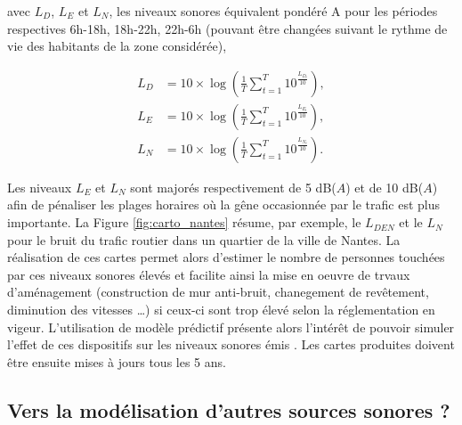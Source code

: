 avec $L_D$, $L_E$ et $L_N$, les niveaux sonores équivalent pondéré A pour les périodes respectives 6h-18h, 18h-22h, 22h-6h (pouvant être changées suivant le rythme de vie des habitants de la zone considérée),

\begin{subequations}
\begin{align}
L_D &= 10\times\log\left(\frac{1}{T} \sum_{t = 1}^{T}10^{\frac{L_{D_t}}{10}}\right),\\
L_E &= 10\times\log\left(\frac{1}{T} \sum_{t = 1}^{T}10^{\frac{L_{E_t}}{10}}\right),\\
L_N &= 10\times\log\left(\frac{1}{T} \sum_{t = 1}^{T}10^{\frac{L_{N_t}}{10}}\right).
\end{align}
\end{subequations}

Les niveaux $L_E$ et $L_N$ sont majorés respectivement de 5 dB($A$) et de 10 dB($A$) afin de pénaliser les plages horaires où la gêne occasionnée par le trafic est plus importante. La Figure \ref{fig:carto_nantes} résume, par exemple, le $L_{DEN}$ et le $L_N$ pour le bruit du trafic routier dans un quartier de la ville de Nantes.
La réalisation de ces cartes permet alors d'estimer le nombre  de personnes touchées par ces niveaux sonores élevés et facilite ainsi la mise en oeuvre de trvaux d'aménagement (construction de mur anti-bruit, chanegement de revêtement, diminution des vitesses \dots) si ceux-ci sont trop élevé selon la réglementation en vigeur. L'utilisation de modèle prédictif présente alors l'intérêt de pouvoir simuler l'effet de ces dispositifs sur les niveaux sonores émis \cite{murphy2011scenario,guedes2011influence}. Les cartes produites doivent être ensuite mises à jours tous les 5 ans.


\subsection{Vers la modélisation d'autres sources sonores ?}

